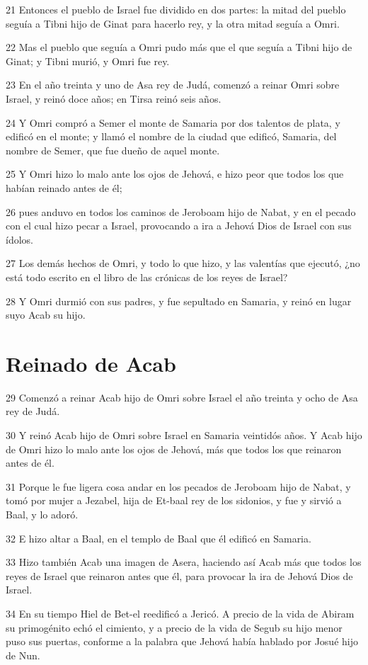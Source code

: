 \par 21 Entonces el pueblo de Israel fue dividido en dos partes: la mitad del pueblo seguía a Tibni hijo de Ginat para hacerlo rey, y la otra mitad seguía a Omri.
\par 22 Mas el pueblo que seguía a Omri pudo más que el que seguía a Tibni hijo de Ginat; y Tibni murió, y Omri fue rey.
\par 23 En el año treinta y uno de Asa rey de Judá, comenzó a reinar Omri sobre Israel, y reinó doce años; en Tirsa reinó seis años.
\par 24 Y Omri compró a Semer el monte de Samaria por dos talentos de plata,  y edificó en el monte; y llamó el nombre de la ciudad que edificó, Samaria, del nombre de Semer, que fue dueño de aquel monte.
\par 25 Y Omri hizo lo malo ante los ojos de Jehová, e hizo peor que todos los que habían reinado antes de él;
\par 26 pues anduvo en todos los caminos de Jeroboam hijo de Nabat, y en el pecado con el cual hizo pecar a Israel, provocando a ira a Jehová Dios de Israel con sus ídolos.
\par 27 Los demás hechos de Omri, y todo lo que hizo, y las valentías que ejecutó, ¿no está todo escrito en el libro de las crónicas de los reyes de Israel?
\par 28 Y Omri durmió con sus padres, y fue sepultado en Samaria, y reinó en lugar suyo Acab su hijo.

\section*{Reinado de Acab}

\par 29 Comenzó a reinar Acab hijo de Omri sobre Israel el año treinta y ocho de Asa rey de Judá.
\par 30 Y reinó Acab hijo de Omri sobre Israel en Samaria veintidós años. Y Acab hijo de Omri hizo lo malo ante los ojos de Jehová, más que todos los que reinaron antes de él.
\par 31 Porque le fue ligera cosa andar en los pecados de Jeroboam hijo de Nabat, y tomó por mujer a Jezabel, hija de Et-baal rey de los sidonios, y fue y sirvió a Baal, y lo adoró.
\par 32 E hizo altar a Baal, en el templo de Baal que él edificó en Samaria.
\par 33 Hizo también Acab una imagen de Asera, haciendo así Acab más que todos los reyes de Israel que reinaron antes que él, para provocar la ira de Jehová Dios de Israel.
\par 34 En su tiempo Hiel de Bet-el reedificó a Jericó. A precio de la vida de Abiram su primogénito echó el cimiento, y a precio de la vida de Segub su hijo menor puso sus puertas, conforme a la palabra que Jehová había hablado por Josué hijo de Nun. 

